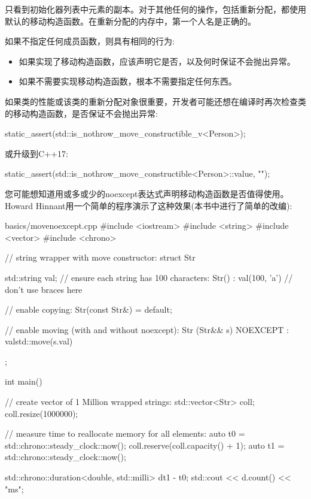只看到初始化器列表中元素的副本。对于其他任何的操作，包括重新分配，都使用默认的移动构造函数。在重新分配的内存中，第一个人名是正确的。\par

如果不指定任何成员函数，则具有相同的行为:\par

\begin{itemize}
  \item 如果实现了移动构造函数，应该声明它是否，以及何时保证不会抛出异常。
  \item 如果不需要实现移动构造函数，根本不需要指定任何东西。
\end{itemize}

如果类的性能或该类的重新分配对象很重要，开发者可能还想在编译时再次检查类的移动构造函数，是否保证不会抛出异常:\par

\begin{codebox}[cpp]
static_assert(std::is_nothrow_move_constructible_v<Person>);
\end{codebox}

或升级到C++17:\par

\begin{codebox}[cpp]
static_assert(std::is_nothrow_move_constructible<Person>::value, "");
\end{codebox}


您可能想知道用或多或少的noexcept表达式声明移动构造函数是否值得使用。Howard Hinnant用一个简单的程序演示了这种效果(本书中进行了简单的改编):\par

\begin{codeboxt}[cpp]{basics/movenoexcept.cpp}
#include <iostream>
#include <string>
#include <vector>
#include <chrono>

// string wrapper with move constructor:
struct Str
{
  std::string val;
  // ensure each string has 100 characters:
  Str()
  : val(100, 'a') { // don’t use braces here
  }

  // enable copying:
  Str(const Str&) = default;

  // enable moving (with and without noexcept):
  Str (Str&& s) NOEXCEPT
  : val{std::move(s.val)} {
  }
};

int main()
{
  // create vector of 1 Million wrapped strings:
  std::vector<Str> coll;
  coll.resize(1000000);

  // measure time to reallocate memory for all elements:
  auto t0 = std::chrono::steady_clock::now();
  coll.reserve(coll.capacity() + 1);
  auto t1 = std::chrono::steady_clock::now();

  std::chrono::duration<double, std::milli> d{t1 - t0};
  std::cout << d.count() << "ms\n";
}
\end{codeboxt}


